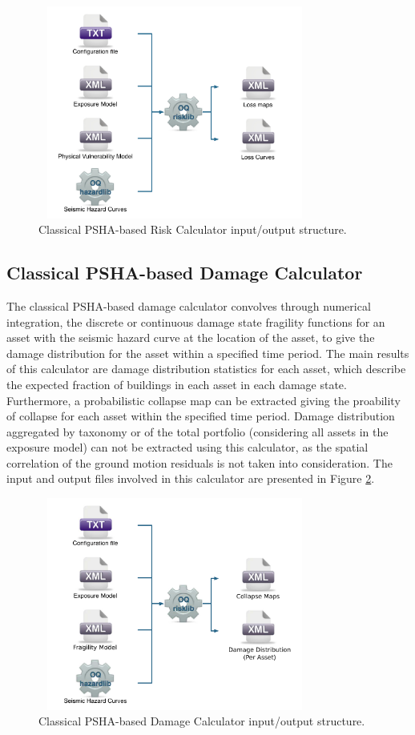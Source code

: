 \begin{figure}[ht]
\centering
\includegraphics[width=9cm,height=7cm]{figures/risk/ClassicalRisk.pdf}
\caption{Classical PSHA-based Risk Calculator input/output structure.}
\label{fig:ClassicalRisk}
\end{figure}

\subsection{Classical PSHA-based Damage Calculator}
The classical PSHA-based damage calculator convolves through numerical integration, the discrete or continuous damage state fragility functions for an asset with the seismic hazard curve at the location of the asset, to give the damage distribution for the asset within a specified time period. The main results of this calculator are damage distribution statistics for each asset, which describe the expected fraction of buildings in each asset in each damage state. Furthermore, a probabilistic collapse map can be extracted giving the proability of collapse for each asset within the specified time period. Damage distribution aggregated by taxonomy or of the total portfolio (considering all assets in the exposure model) can not be extracted using this calculator, as the spatial correlation of the ground motion residuals is not taken into consideration. The input and output files involved in this calculator are presented in Figure \ref{fig:ClassicalDamage}.

\begin{figure}[ht]
\centering
\includegraphics[width=9cm,height=7cm]{figures/risk/ClassicalDamage.pdf}
\caption{Classical PSHA-based Damage Calculator input/output structure.}
\label{fig:ClassicalDamage}
\end{figure}

